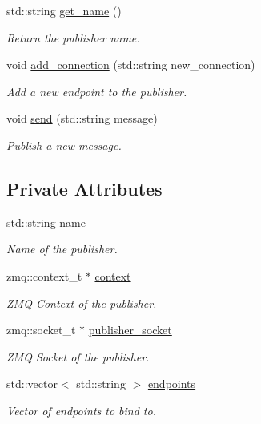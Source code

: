 \begin{DoxyCompactItemize}
std\-::string \hyperlink{classzcm_1_1Publisher_adc12b48e001014854e35141457d5c90d}{get\-\_\-name} ()
\begin{DoxyCompactList}\small\item\em Return the publisher name. \end{DoxyCompactList}\item 
void \hyperlink{classzcm_1_1Publisher_aa581fdeacd01dca767c2c1d0e3e4031f}{add\-\_\-connection} (std\-::string new\-\_\-connection)
\begin{DoxyCompactList}\small\item\em Add a new endpoint to the publisher. \end{DoxyCompactList}\item 
void \hyperlink{classzcm_1_1Publisher_a1e72bb0eef5a99fdbec0e2df957668e0}{send} (std\-::string message)
\begin{DoxyCompactList}\small\item\em Publish a new message. \end{DoxyCompactList}\end{DoxyCompactItemize}
\subsection*{Private Attributes}
\begin{DoxyCompactItemize}
\item 
std\-::string \hyperlink{classzcm_1_1Publisher_a2e3902339b55647dc6a7d2f3de64d8fe}{name}
\begin{DoxyCompactList}\small\item\em Name of the publisher. \end{DoxyCompactList}\item 
zmq\-::context\-\_\-t $\ast$ \hyperlink{classzcm_1_1Publisher_a399965216cd17f1097313f044487d968}{context}
\begin{DoxyCompactList}\small\item\em Z\-M\-Q Context of the publisher. \end{DoxyCompactList}\item 
zmq\-::socket\-\_\-t $\ast$ \hyperlink{classzcm_1_1Publisher_acb22f36a592a5a0beaf4100e472578d5}{publisher\-\_\-socket}
\begin{DoxyCompactList}\small\item\em Z\-M\-Q Socket of the publisher. \end{DoxyCompactList}\item 
std\-::vector$<$ std\-::string $>$ \hyperlink{classzcm_1_1Publisher_a34548b5f2611391263acd10cb7d197e5}{endpoints}
\begin{DoxyCompactList}\small\item\em Vector of endpoints to bind to. \end{DoxyCompactList}\end{DoxyCompactItemize}


